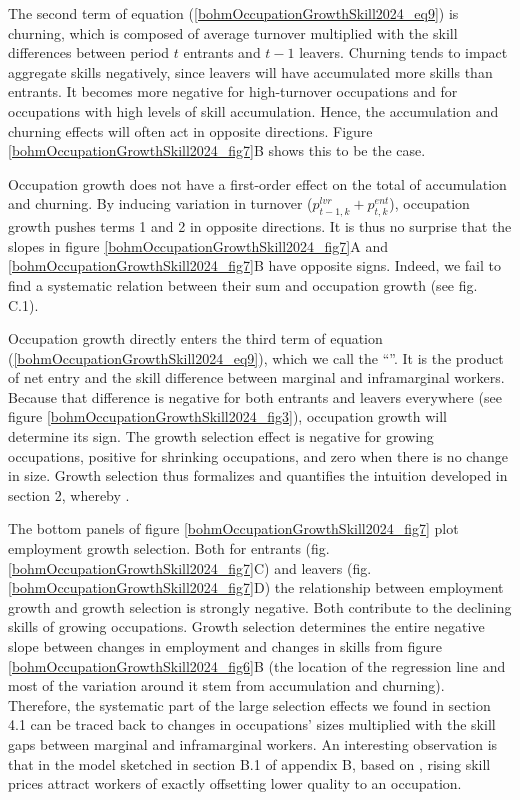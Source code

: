 \documentclass[12pt]{article}
\newcommand{\highlightB}[1]{{\emph{\color{MyBlue}{#1}}}}
\newcommand{\highlightPP}[1]{{\emph{\color{MyPurple}{#1}}}}
\theoremstyle{definition}
\begin{document}
The second term of equation (\ref{bohmOccupationGrowthSkill2024_eq9}) is churning, which is composed of average turnover multiplied with the skill differences between period $t$ entrants and $t-1$ leavers. Churning tends to impact aggregate skills negatively, since leavers will have accumulated more skills than entrants. It becomes more negative for high-turnover occupations and for occupations with high levels of skill accumulation. Hence, the accumulation and churning effects will often act in opposite directions. Figure \ref{bohmOccupationGrowthSkill2024_fig7}B shows this to be the case.

Occupation growth does not have a first-order effect on the total of accumulation and churning. By inducing variation in turnover ($p_{t-1, k}^{lvr} + p_{t, k}^{ent}$), occupation growth pushes terms 1 and 2 in opposite directions. It is thus no surprise that the slopes in figure \ref{bohmOccupationGrowthSkill2024_fig7}A and \ref{bohmOccupationGrowthSkill2024_fig7}B have opposite signs. Indeed, we fail to find a systematic relation between their sum and occupation growth (see fig. C.1).

Occupation growth directly enters the third term of equation (\ref{bohmOccupationGrowthSkill2024_eq9}), which we call the ``\highlightB{growth selection effect}''. It is the product of net entry and the skill difference between marginal and inframarginal workers. Because that difference is negative for both entrants and leavers everywhere (see figure \ref{bohmOccupationGrowthSkill2024_fig3}), occupation growth will determine its sign. The growth selection effect is negative for growing occupations, positive for shrinking occupations, and zero when there is no change in size. Growth selection thus formalizes and quantifies the intuition developed in section 2, whereby \highlightPP{the more an occupation grows, the more net entry of less skilled workers it experiences}.

The bottom panels of figure \ref{bohmOccupationGrowthSkill2024_fig7} plot employment growth selection. Both for entrants (fig. \ref{bohmOccupationGrowthSkill2024_fig7}C) and leavers (fig. \ref{bohmOccupationGrowthSkill2024_fig7}D) the relationship between employment growth and growth selection is strongly negative. Both contribute to the declining skills of growing occupations. Growth selection determines the entire negative slope between changes in employment and changes in skills from figure \ref{bohmOccupationGrowthSkill2024_fig6}B (the location of the regression line and most of the variation around it stem from accumulation and churning). Therefore, the systematic part of the large selection effects we found in section 4.1 can be traced back to changes in occupations' sizes multiplied with the skill gaps between marginal and inframarginal workers. An interesting observation is that in the model sketched in section B.1 of appendix B, based on \citet{hsiehAllocationTalentUS2019}, rising skill prices attract workers of exactly offsetting lower quality to an occupation.
\end{document}
